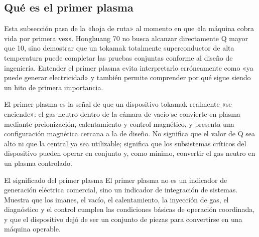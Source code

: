 \subsection{Qué es el primer plasma}

Esta subsección pasa de la «hoja de ruta» al momento en que «la máquina cobra vida por primera vez». Honghuang 70 no busca alcanzar directamente Q mayor que 10, sino demostrar que un tokamak totalmente superconductor de alta temperatura puede completar las pruebas conjuntas conforme al diseño de ingeniería. Entender el primer plasma evita interpretarlo erróneamente como «ya puede generar electricidad» y también permite comprender por qué sigue siendo un hito de primera importancia.

El primer plasma es la señal de que un dispositivo tokamak realmente «se enciende»: el gas neutro dentro de la cámara de vacío se convierte en plasma mediante preionización, calentamiento y control magnético, y presenta una configuración magnética cercana a la de diseño. No significa que el valor de Q sea alto ni que la central ya sea utilizable; significa que los subsistemas críticos del dispositivo pueden operar en conjunto y, como mínimo, convertir el gas neutro en un plasma controlado.

\begin{importantbox}{El significado del primer plasma}
El primer plasma no es un indicador de generación eléctrica comercial, sino un indicador de integración de sistemas. Muestra que los imanes, el vacío, el calentamiento, la inyección de gas, el diagnóstico y el control cumplen las condiciones básicas de operación coordinada, y que el dispositivo dejó de ser un conjunto de piezas para convertirse en una máquina operable.
\end{importantbox}

